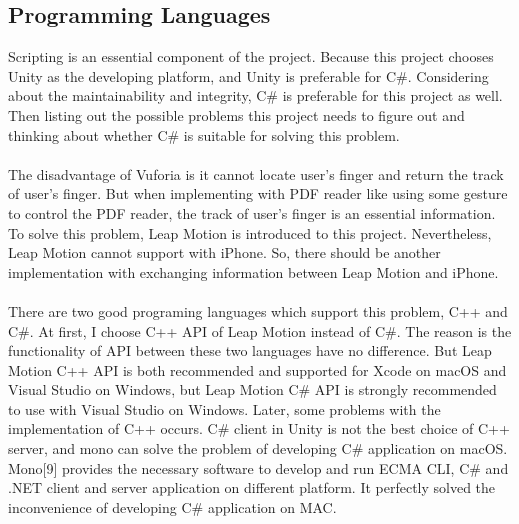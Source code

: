 \subsection{Programming Languages}
Scripting is an essential component of the project. Because this project chooses Unity as the developing platform, and Unity is preferable for C\#. Considering about the maintainability and integrity, C\# is preferable for this project as well. Then listing out the possible problems this project needs to figure out and thinking about whether C\# is suitable for solving this problem.
\\
\\
The disadvantage of Vuforia is it cannot locate user’s finger and return the track of user’s finger. But when implementing with PDF reader like using some gesture to control the PDF reader, the track of user’s finger is an essential information. To solve this problem, Leap Motion is introduced to this project. Nevertheless, Leap Motion cannot support with iPhone. So, there should be another implementation with exchanging information between Leap Motion and iPhone. 
\\
\\
There are two good programing languages which support this problem, C++ and C\#. At first, I choose C++ API of Leap Motion instead of C\#. The reason is the functionality of API between these two languages have no difference. But Leap Motion C++ API is both recommended and supported for Xcode on macOS and Visual Studio on Windows, but Leap Motion C\# API is strongly recommended to use with Visual Studio on Windows. Later, some problems with the implementation of C++ occurs. C\# client in Unity is not the best choice of C++ server, and mono can solve the problem of developing C\# application on macOS. Mono[9] provides the necessary software to develop and run ECMA CLI, C\# and .NET client and server application on different platform. It perfectly solved the inconvenience of developing C\# application on MAC.

